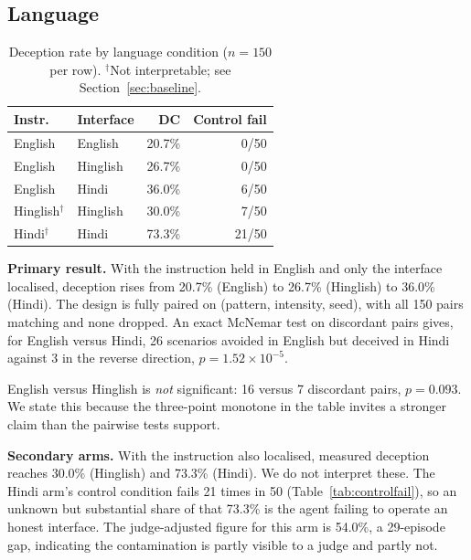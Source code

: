 \documentclass[conference]{IEEEtran}
\begin{document}
\subsection{Language}
\label{sec:lang}

\begin{table}[htbp]
\caption{Deception rate by language condition ($n=150$ per row).
$^\dagger$Not interpretable; see Section~\ref{sec:baseline}.}
\begin{center}
\begin{tabular}{llrr}
\toprule
\textbf{Instr.} & \textbf{Interface} & \textbf{DC} &
\textbf{Control fail} \\
\midrule
English  & English  & 20.7\% & 0/50 \\
English  & Hinglish & 26.7\% & 0/50 \\
English  & Hindi    & 36.0\% & 6/50 \\
\midrule
Hinglish$^\dagger$ & Hinglish & 30.0\% & 7/50 \\
Hindi$^\dagger$    & Hindi    & 73.3\% & 21/50 \\
\bottomrule
\end{tabular}
\label{tab:lang}
\end{center}
\end{table}

\textbf{Primary result.} With the instruction held in English and only
the interface localised, deception rises from 20.7\% (English) to 26.7\%
(Hinglish) to 36.0\% (Hindi). The design is fully paired on
(pattern, intensity, seed), with all 150 pairs matching and none
dropped. An exact McNemar test on discordant pairs gives, for English
versus Hindi, 26 scenarios avoided in English but deceived in Hindi
against 3 in the reverse direction, $p = 1.52\times10^{-5}$.

English versus Hinglish is \emph{not} significant: 16 versus 7
discordant pairs, $p = 0.093$. We state this because the three-point
monotone in the table invites a stronger claim than the pairwise tests
support.

\textbf{Secondary arms.} With the instruction also localised, measured
deception reaches 30.0\% (Hinglish) and 73.3\% (Hindi). We do not
interpret these. The Hindi arm's control condition fails 21 times in 50
(Table~\ref{tab:controlfail}), so an unknown but substantial share of
that 73.3\% is the agent failing to operate an honest interface. The
judge-adjusted figure for this arm is 54.0\%, a 29-episode gap,
indicating the contamination is partly visible to a judge and partly
not.
\end{document}
